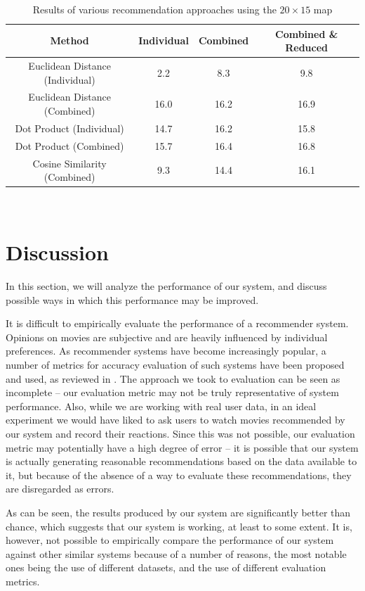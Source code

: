 \documentclass[conference]{IEEEtran}
\begin{document}
\begin{table}[htpb]
\begin{tabular}{c||c|c|c}
Method                          & Individual & Combined & Combined \& Reduced \\
\hline
Euclidean Distance (Individual) & 2.2        & 8.3      & 9.8                  \\
Euclidean Distance (Combined)   & 16.0       & 16.2     & 16.9                 \\
Dot Product (Individual)        & 14.7       & 16.2     & 15.8                 \\
Dot Product (Combined)          & 15.7       & 16.4     & 16.8                 \\
Cosine Similarity (Combined)    & 9.3        & 14.4     & 16.1 \\               \end{tabular}
\\
\caption{Results of various recommendation approaches using the $20 \times 15$ map}
\end{table}

\section{Discussion}
In this section, we will analyze the performance of our system, and discuss possible ways in which this performance may be improved.

It is difficult to empirically evaluate the performance of a recommender system. Opinions on movies are subjective and are heavily influenced by individual preferences. As recommender systems have become increasingly popular, a number of metrics for accuracy evaluation of such systems have been proposed and used, as reviewed in \cite{gunawardana2009survey}. The approach we took to evaluation can be seen as incomplete – our evaluation metric may not be truly representative of system performance. Also, while we are working with real user data, in an ideal experiment we would have liked to ask users to watch movies recommended by our system and record their reactions. Since this was not possible, our evaluation metric may potentially have a high degree of error – it is possible that our system is actually generating reasonable recommendations based on the data available to it, but because of the absence of a way to evaluate these recommendations, they are disregarded as errors.

As can be seen, the results produced by our system are significantly better than chance, which suggests that our system is working, at least to some extent. It is, however, not possible to empirically compare the performance of our system against other similar systems because of a number of reasons, the most notable ones being the use of different datasets, and the use of different evaluation metrics. 
\end{document}
